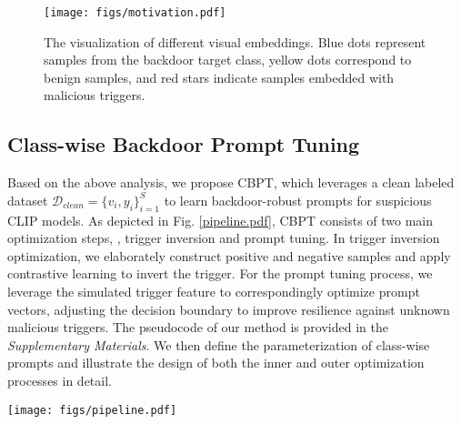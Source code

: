 \begin{figure}[t]
\begin{center}
\texttt{[image: figs/motivation.pdf]}
\end{center}
\caption{The visualization of different visual embeddings. Blue dots represent samples from the backdoor target class, yellow dots correspond to benign samples, and red stars indicate samples embedded with malicious triggers.}
\label{fig:motivation}
\end{figure}

\subsection{Class-wise Backdoor Prompt Tuning}
Based on the above analysis, we propose CBPT, which leverages a clean labeled dataset $\mathcal{D}_{clean}=\{v_i, y_i\}_{i=1}^S$ to learn backdoor-robust prompts for suspicious CLIP models. As depicted in Fig. \ref{pipeline.pdf}, CBPT consists of two main optimization steps, \ie, trigger inversion and prompt tuning. In trigger inversion optimization, we elaborately construct positive and negative samples and apply contrastive learning to invert the trigger. For the prompt tuning process, we leverage the simulated trigger feature to correspondingly optimize prompt vectors, adjusting the decision boundary to improve resilience against unknown malicious triggers. The pseudocode of our method is provided in the \textit{Supplementary Materials}. We then define the parameterization of class-wise prompts and illustrate the design of both the inner and outer optimization processes in detail. 
\begin{figure*}
\centering
\texttt{[image: figs/pipeline.pdf]}
\caption{Illustration of the proposed Class-wise Backdoor Prompt Tuning (CBPT) method. The image and text encoders remain frozen in both trigger inversion optimization and prompt tuning optimization, while the learnable context is class-specific.} 
\label{pipeline.pdf}
\end{figure*}

